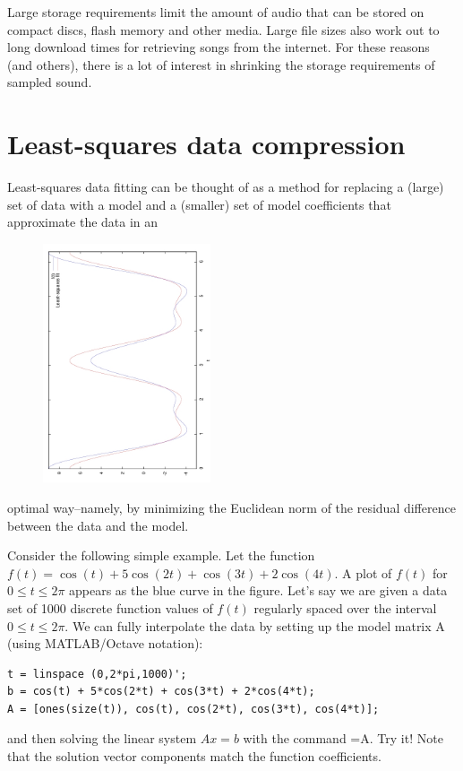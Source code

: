 \documentclass[10pt]{article}
\begin{document}
    Large storage requirements limit the amount of audio that can be stored on
compact discs, flash memory and other media.  Large file sizes also work out to
long download times for retrieving songs from the internet. For these reasons
(and others), there is a lot of interest in shrinking the storage requirements
of sampled sound.


\section*{Least-squares data compression}

Least-squares data fitting can be thought of as a method for replacing a
(large) set of data with a model and a (smaller) set of model coefficients that
approximate the data in an 
\begin{figure}
  \begin{center}
  \vspace{-20pt}
\includegraphics[angle=270,width=0.44\textwidth]{fig2}
  \end{center}
  \vspace{-50pt}
\end{figure}
optimal way--namely, by minimizing the
Euclidean norm of the residual difference between the data and the model.

Consider the following simple example. Let the function   
$f(t) = \cos(t) + 5\cos(2t) + \cos(3t) + 2\cos(4t).$ 
A plot of $f(t)$ for $0\le t\le 2\pi$ appears as the blue curve in the
figure. 
Let's say we are given a data set of 1000 discrete function values
of $f(t)$ regularly spaced over the interval $0\le t\le 2\pi$. We can fully
interpolate the data by setting up the model matrix A (using
MATLAB/Octave notation):
\begin{verbatim}
t = linspace (0,2*pi,1000)';
b = cos(t) + 5*cos(2*t) + cos(3*t) + 2*cos(4*t);
A = [ones(size(t)), cos(t), cos(2*t), cos(3*t), cos(4*t)];
\end{verbatim}
and then solving the linear system $Ax=b$ with the command 
{\verb@x=A\b@}. 
Try it! Note that the solution vector components match the function
coefficients.
\end{document}
